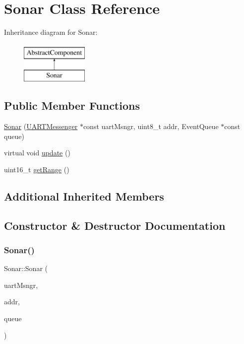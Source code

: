 \hypertarget{class_sonar}{}\section{Sonar Class Reference}
\label{class_sonar}
Inheritance diagram for Sonar\+:\begin{figure}[H]
\begin{center}
\leavevmode
\includegraphics[height=2.000000cm]{class_sonar}
\end{center}
\end{figure}
\subsection*{Public Member Functions}
\begin{DoxyCompactItemize}
\item 
\hyperlink{class_sonar_a8199e2b1d48626cc0404708063d7fe42}{Sonar} (\hyperlink{class_u_a_r_t_messenger}{U\+A\+R\+T\+Messenger} $\ast$const uart\+Msngr, uint8\+\_\+t addr, Event\+Queue $\ast$const queue)
\item 
virtual void \hyperlink{class_sonar_aaf10dd734528b86b4dea3ab35c4ee4f4}{update} ()
\item 
uint16\+\_\+t \hyperlink{class_sonar_a7a641bcfac1967fbc42eea2ab70886dc}{get\+Range} ()
\end{DoxyCompactItemize}
\subsection*{Additional Inherited Members}


\subsection{Constructor \& Destructor Documentation}
\mbox{\label{class_sonar_a8199e2b1d48626cc0404708063d7fe42}} 
\subsubsection{\texorpdfstring{Sonar()}{Sonar()}}
{\footnotesize\ttfamily Sonar\+::\+Sonar (\begin{DoxyParamCaption}\item[{\hyperlink{class_u_a_r_t_messenger}{U\+A\+R\+T\+Messenger} $\ast$const}]{uart\+Msngr,  }\item[{uint8\+\_\+t}]{addr,  }\item[{Event\+Queue $\ast$const}]{queue }\end{DoxyParamCaption})}


